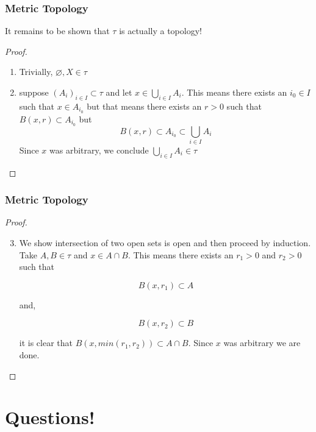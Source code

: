 \documentclass{beamer}
\begin{document}
\begin{frame}
    \frametitle{Metric Topology}

    It remains to be shown that $\tau$ is actually a topology! \pause
    \begin{proof}
        \begin{enumerate}
            \item Trivially, $\varnothing, X\in \tau$
            \item suppose $(A_i)_{i\in I}\subset \tau$ and let $x\in\bigcup_{i\in I}A_i$. \pause This means there exists an $i_0\in I$ such that $x\in A_{i_0}$
            but that means there exists an $r>0$ such that $B(x, r)\subset A_{i_0}$ \pause but
            \[B(x, r)\subset A_{i_0}\subset \bigcup_{i\in I} A_i\] \pause
            Since $x$ was arbitrary, we conclude $\bigcup_{i\in I} A_i\in \tau$
        \end{enumerate}
    \end{proof}

\end{frame}

\begin{frame}
    \frametitle{Metric Topology}

    \begin{proof}
        \begin{enumerate}
            \setcounter{enumi}{2}
            \item We show intersection of two open sets is open and then proceed by induction. \pause Take $A, B\in\tau$ and $x\in A\cap B$. This means 
            there exists an $r_1>0$ and $r_2>0$ such that
            \begin{minipage}{0.45\linewidth}
            \[
                B(x, r_1)\subset A
            \]
            \end{minipage}
            \hfill
            and,
            \hfill
            \begin{minipage}{0.45\linewidth}
            \[
                B(x, r_2)\subset B
            \]
            \end{minipage} \pause
            it is clear that $B(x, min(r_1, r_2))\subset A\cap B$. Since $x$ was arbitrary we are done.
        \end{enumerate}
    \end{proof}

\end{frame}

\section{Questions!}
\end{document}

